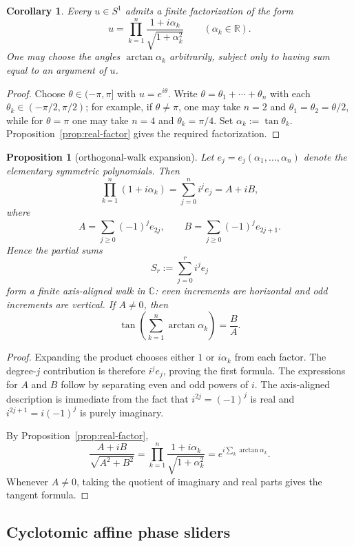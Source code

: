 \documentclass[11pt,a4paper]{article}
\newtheorem{proposition}[theorem]{Proposition}
\newtheorem{corollary}[theorem]{Corollary}
\theoremstyle{definition}
\theoremstyle{remark}
\newcommand{\RR}{\mathbb R}
\newcommand{\CC}{\mathbb C}
\begin{document}
\begin{corollary}\label{cor:all-phases-real-factors}
Every $u\in S^1$ admits a finite factorization of the form
\[
u=\prod_{k=1}^n \frac{1+i\alpha_k}{\sqrt{1+\alpha_k^2}}
\qquad (\alpha_k\in\RR).
\]
One may choose the angles $\arctan\alpha_k$ arbitrarily, subject only to having sum equal to an argument of $u$.
\end{corollary}

\begin{proof}
Choose $\theta\in(-\pi,\pi]$ with $u=e^{i\theta}$. Write $\theta=\theta_1+\cdots+\theta_n$ with each $\theta_k\in(-\pi/2,\pi/2)$; for example, if $\theta\neq \pi$, one may take $n=2$ and $\theta_1=\theta_2=\theta/2$, while for $\theta=\pi$ one may take $n=4$ and $\theta_k=\pi/4$. Set $\alpha_k:=\tan\theta_k$. Proposition~\ref{prop:real-factor} gives the required factorization.
\end{proof}

\begin{proposition}[orthogonal-walk expansion]\label{prop:orthogonal-walk}
Let $e_j=e_j(\alpha_1,\dots,\alpha_n)$ denote the elementary symmetric polynomials. Then
\[
\prod_{k=1}^n (1+i\alpha_k)=\sum_{j=0}^n i^j e_j
= A+iB,
\]
where
\[
A=\sum_{j\geq 0}(-1)^j e_{2j},
\qquad
B=\sum_{j\geq 0}(-1)^j e_{2j+1}.
\]
Hence the partial sums
\[
S_r:=\sum_{j=0}^r i^j e_j
\]
form a finite axis-aligned walk in $\CC$: even increments are horizontal and odd increments are vertical. If $A\neq 0$, then
\[
\tan\!\left(\sum_{k=1}^n \arctan\alpha_k\right)=\frac{B}{A}.
\]
\end{proposition}

\begin{proof}
Expanding the product chooses either $1$ or $i\alpha_k$ from each factor. The degree-$j$ contribution is therefore $i^j e_j$, proving the first formula. The expressions for $A$ and $B$ follow by separating even and odd powers of $i$. The axis-aligned description is immediate from the fact that $i^{2j}=(-1)^j$ is real and $i^{2j+1}=i(-1)^j$ is purely imaginary.

By Proposition~\ref{prop:real-factor},
\[
\frac{A+iB}{\sqrt{A^2+B^2}}
=\prod_{k=1}^n \frac{1+i\alpha_k}{\sqrt{1+\alpha_k^2}}
=e^{i\sum_k \arctan\alpha_k}.
\]
Whenever $A\neq0$, taking the quotient of imaginary and real parts gives the tangent formula.
\end{proof}

\subsection{Cyclotomic affine phase sliders}
\end{document}
